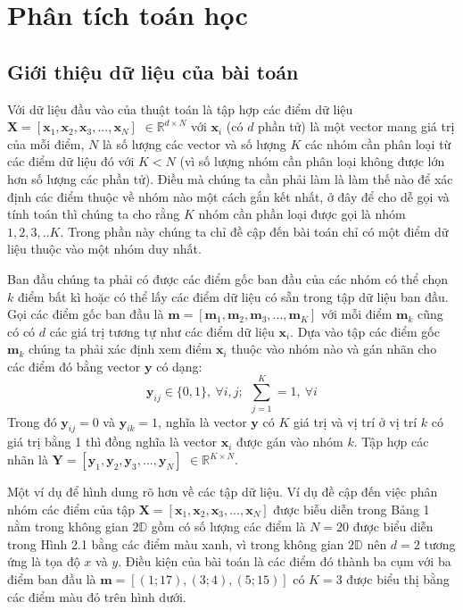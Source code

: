 \documentclass{article}
\begin{document}
	\section{Phân tích toán học} %
	\subsection{Giới thiệu dữ liệu của bài toán}
	\label{sec:phân_tích_toán_học}
	Với dữ liệu đầu vào của thuật toán là tập hợp các điểm dữ liệu $\mathbf{X} = [\mathbf{x}_1,\mathbf{x}_2,\mathbf{x}_3,...,\mathbf{x}_N]$ $\in \mathds{R}^{d\times N}$ với $\mathbf{x}_i$ (có $d$ phần tử) là một vector mang giá trị của mỗi điểm, $N$ là số lượng các vector và số lượng $K$ các nhóm cần phân loại từ các điểm dữ liệu đó với $K < N$ (vì số lượng nhóm cần phân loại không được lớn hơn số lượng các phần tử). Điều mà chúng ta cần phải làm là làm thế nào để xác định các điểm thuộc về nhóm nào một cách gắn kết nhất, ở đây để cho dễ gọi và tính toán thì chúng ta cho rằng $K$ nhóm cần phần loại được gọi là nhóm $1,2,3,..K$. Trong phần này chúng ta chỉ đề cập đến bài toán chỉ có một điểm dữ liệu thuộc vào một nhóm duy nhất.\par
	Ban đầu chúng ta phải có được các điểm gốc ban đầu của các nhóm có thể chọn $k$ điểm bất kì hoặc có thể lấy các điểm dữ liệu có sẵn trong tập dữ liệu ban đầu. Gọi các điểm gốc ban đầu là $\mathbf{m} = [\mathbf{m}_1,\mathbf{m}_2,\mathbf{m}_3,...,\mathbf{m}_K]$ với mỗi điểm $\mathbf{m}_k$ cũng có có $d$ các giá trị tương tự như các điểm dữ liệu $\mathbf{x}_i$. Dựa vào tập các điểm gốc $\mathbf{m}_k$ chúng ta phải xác định xem điểm $\mathbf{x}_i$ thuộc vào nhóm nào và gán nhãn cho các điểm đó bằng vector $\mathbf{y}$ có dạng:
	$$\mathbf{y}_{ij} \in \{0,1\},\ \forall i,j;\ \  \sum_{j = 1}^{K} = 1,\  \forall i$$
	Trong đó $\mathbf{y}_{ij} = 0$ và $\mathbf{y}_{ik} = 1$, nghĩa là vector $\mathbf{y}$ có $K$ giá trị và vị trí ở vị trí $k$ có giá trị bằng 1 thì đồng nghĩa là vector $\mathbf{x}_i$ được gán vào nhóm $k$. Tập hợp các nhãn là $\mathbf{Y} = [\mathbf{y}_1,\mathbf{y}_2,\mathbf{y}_3,...,\mathbf{y}_N]$ $\in \mathds{R}^{K\times N}$.\par
	Một ví dụ để hình dung rõ hơn về các tập dữ liệu. Ví dụ đề cập đến việc phân nhóm các điểm của tập $\mathbf{X} = [\mathbf{x}_1,\mathbf{x}_2,\mathbf{x}_3,...,\mathbf{x}_N]$ được biễu diễn trong Bảng 1 nằm trong  không gian $2\mathds{D}$ gồm có số lượng các điểm là $N = 20$ được biểu diễn trong Hình 2.1 bằng các điểm màu xanh, vì trong không gian $2\mathds{D}$ nên $d = 2$ tương ứng là tọa độ $x$ và $y$. Điều kiện của bài toán là các điểm đó thành ba cụm với ba điểm ban đầu là $\mathbf{m} = [(1;17),(3;4),(5;15)]$ có $K = 3$ được biểu thị bằng các điểm màu đỏ trên hình dưới.
\end{document}
